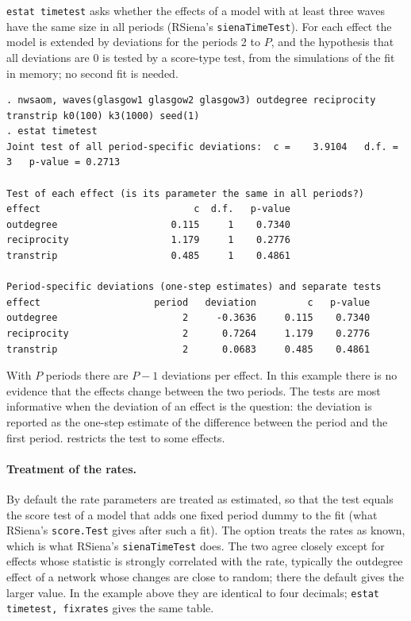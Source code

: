 \texttt{estat timetest} asks whether the effects of a model with at least three waves have the same size in all periods (RSiena's \texttt{sienaTimeTest}). For each effect the model is extended by deviations for the periods 2 to $P$, and the hypothesis that all deviations are 0 is tested by a score-type test, from the simulations of the fit in memory; no second fit is needed.
\begin{lstlisting}
. nwsaom, waves(glasgow1 glasgow2 glasgow3) outdegree reciprocity transtrip k0(100) k3(1000) seed(1)
. estat timetest
Joint test of all period-specific deviations:  c =    3.9104   d.f. = 3   p-value = 0.2713

Test of each effect (is its parameter the same in all periods?)
effect                           c  d.f.   p-value
outdegree                    0.115     1    0.7340
reciprocity                  1.179     1    0.2776
transtrip                    0.485     1    0.4861

Period-specific deviations (one-step estimates) and separate tests
effect                    period   deviation         c   p-value
outdegree                      2     -0.3636     0.115    0.7340
reciprocity                    2      0.7264     1.179    0.2776
transtrip                      2      0.0683     0.485    0.4861
\end{lstlisting}
With $P$ periods there are $P-1$ deviations per effect. In this example there is no evidence that the effects change between the two periods. The tests are most informative when the deviation of an effect is the question: the deviation is reported as the one-step estimate of the difference between the period and the first period.  restricts the test to some effects.

\paragraph{Treatment of the rates.} By default the rate parameters are treated as estimated, so that the test equals the score test of a model that adds one fixed period dummy to the fit (what RSiena's \texttt{score.Test} gives after such a fit). The option  treats the rates as known, which is what RSiena's \texttt{sienaTimeTest} does. The two agree closely except for effects whose statistic is strongly correlated with the rate, typically the outdegree effect of a network whose changes are close to random; there the default gives the larger value. In the example above they are identical to four decimals; \texttt{estat timetest, fixrates} gives the same table.

